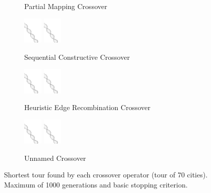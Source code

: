 \begin{figure}
\begin{subfigure}[b]{0.3\textwidth}
		\caption{Partial Mapping Crossover}
		\label{fig:z}
    	\end{subfigure}
%
	\begin{subfigure}[b]{0.3\textwidth}
		\centering
		\includegraphics[width=0.1\textwidth]{res/cover.png}
		\includegraphics[width=0.1\textwidth]{res/cover.png}
		\caption{Sequential Constructive Crossover}
		\label{fig:x}
    	\end{subfigure}
%
	\begin{subfigure}[b]{0.3\textwidth}
		\centering
		\includegraphics[width=0.1\textwidth]{res/cover.png}
		\includegraphics[width=0.1\textwidth]{res/cover.png}
		\caption{Heuristic Edge Recombination Crossover}
		\label{fig:y}
    	\end{subfigure}
%
	\begin{subfigure}[b]{0.3\textwidth}
		\centering
		\includegraphics[width=0.1\textwidth]{res/cover.png}
		\includegraphics[width=0.1\textwidth]{res/cover.png}
		\caption{Unnamed Crossover}
		\label{fig:z}
    	\end{subfigure}
	\caption{Shortest tour found by each crossover operator (tour of 70 cities). Maximum of 1000 generations and basic stopping criterion.}
	\label{fig:rescross}
\end{figure}

